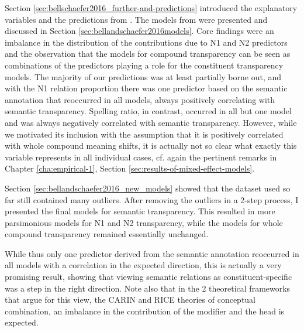 Section \ref{sec:bellschaefer2016_further-and-predictions} introduced the explanatory variables
and the predictions from \citet{BellandSchaefer:2016}. The models
from \citet{BellandSchaefer:2016} were presented and discussed in
Section \ref{sec:bellandschaefer2016models}. Core findings were an
 imbalance in the distribution of the contributions due to N1
and N2 predictors and the observation that the models for compound
transparency can be seen as combinations of the predictors playing a
role for the constituent transparency models. The majority of our
predictions was at least partially borne out, and with the N1 relation
proportion there was one predictor based on the semantic annotation that reoccurred in all models,
always positively correlating with semantic transparency. Spelling
ratio, in contrast, occurred in all but one model and was always
negatively correlated with semantic transparency. However, while we motivated
its inclusion with the assumption that it is positively correlated
with whole compound meaning shifts, it is actually not so clear
what exactly this variable represents in all individual cases,
cf. again the pertinent remarks in Chapter \ref{cha:empirical-1},
Section \ref{sec:results-of-mixed-effect-models}.

Section \ref{sec:bellandschaefer2016_new_models} showed that the dataset used
so far still contained many outliers. After removing the outliers in a
2-step process, I presented the final models for semantic
transparency. This resulted in more parsimonious models for N1 and N2
transparency, while the models for whole compound transparency
remained essentially unchanged.

While thus only one predictor derived from the semantic annotation
reoccurred in all models with a correlation in the expected direction,
this is actually a very promising result, showing that viewing semantic
relations as constituent-specific was a step in the right
direction. Note also that in the 2 theoretical frameworks that argue
for this view, the CARIN and RICE theories of conceptual combination,
an imbalance in the contribution of the modifier and the head is
expected.





